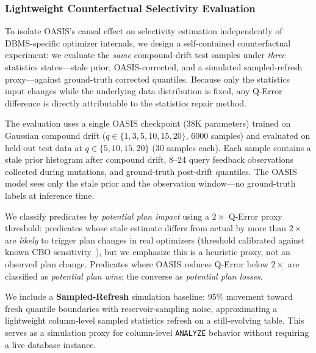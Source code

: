 \documentclass[runningheads]{llncs}
\begin{document}
\subsubsection{Lightweight Counterfactual Selectivity Evaluation}
\label{sec:lightweight_e2e}

To isolate OASIS's causal effect on selectivity estimation independently of DBMS-specific optimizer internals, we design a self-contained counterfactual experiment: we evaluate the \emph{same} compound-drift test samples under \emph{three} statistics states---stale prior, OASIS-corrected, and a simulated sampled-refresh proxy---against ground-truth corrected quantiles. Because only the statistics input changes while the underlying data distribution is fixed, any Q-Error difference is directly attributable to the statistics repair method.

The evaluation uses a single OASIS checkpoint (38K parameters) trained on Gaussian compound drift ($q{\in}\{1,3,5,10,15,20\}$, 6000 samples) and evaluated on held-out test data at $q{\in}\{5,10,15,20\}$ (30 samples each). Each sample contains a stale prior histogram after compound drift, 8--24 query feedback observations collected during mutations, and ground-truth post-drift quantiles. The OASIS model sees only the stale prior and the observation window---no ground-truth labels at inference time.

We classify predicates by \emph{potential plan impact} using a $2\times$ Q-Error proxy threshold: predicates whose stale estimate differs from actual by more than $2\times$ are \emph{likely} to trigger plan changes in real optimizers (threshold calibrated against known CBO sensitivity~\cite{leis2015good}), but we emphasize this is a heuristic proxy, not an observed plan change. Predicates where OASIS reduces Q-Error below $2\times$ are classified as \emph{potential plan wins}; the converse as \emph{potential plan losses}.

We include a \textbf{Sampled-Refresh} simulation baseline: 95\% movement toward fresh quantile boundaries with reservoir-sampling noise, approximating a lightweight column-level sampled statistics refresh on a still-evolving table. This serves as a simulation proxy for column-level \texttt{ANALYZE} behavior without requiring a live database instance.
\end{document}
